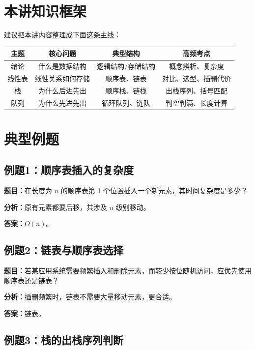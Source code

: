 \documentclass{../../note}
\begin{document}
\section{本讲知识框架}

建议把本讲内容整理成下面这条主线：

\begin{center}
\begin{tabular}{|c|c|c|c|}
\hline
主题 & 核心问题 & 典型结构 & 高频考点 \\
\hline
绪论 & 什么是数据结构 & 逻辑结构/存储结构 & 概念辨析、复杂度 \\
\hline
线性表 & 线性关系如何存储 & 顺序表、链表 & 对比、选型、插删代价 \\
\hline
栈 & 为什么后进先出 & 顺序栈、链栈 & 出栈序列、括号匹配 \\
\hline
队列 & 为什么先进先出 & 循环队列、链队 & 判空判满、长度计算 \\
\hline
\end{tabular}
\end{center}

\section{典型例题}

\subsection{例题1：顺序表插入的复杂度}

\textbf{题目：}在长度为 $n$ 的顺序表第 1 个位置插入一个新元素，其时间复杂度是多少？

\textbf{分析：}原有元素都要后移，共涉及 $n$ 级别移动。

\textbf{答案：}$O(n)$。

\subsection{例题2：链表与顺序表选择}

\textbf{题目：}若某应用系统需要频繁插入和删除元素，而较少按位随机访问，应优先使用顺序表还是链表？

\textbf{分析：}插删频繁时，链表不需要大量移动元素，更合适。

\textbf{答案：}链表。

\subsection{例题3：栈的出栈序列判断}
\end{document}
